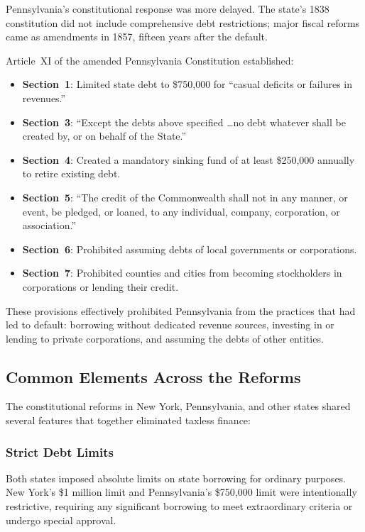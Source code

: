 \documentclass[11pt]{article}
\begin{document}
Pennsylvania's constitutional response was more delayed.  The state's 1838
constitution did not include comprehensive debt restrictions; major fiscal
reforms came as amendments in 1857, fifteen years after the default.

Article~XI of the amended Pennsylvania Constitution established:

\begin{itemize}
  \item \textbf{Section~1}: Limited state debt to \$750,000 for ``casual
    deficits or failures in revenues.''
  \item \textbf{Section~3}: ``Except the debts above specified \ldots no debt
    whatever shall be created by, or on behalf of the State.''
  \item \textbf{Section~4}: Created a mandatory sinking fund of at least
    \$250,000 annually to retire existing debt.
  \item \textbf{Section~5}: ``The credit of the Commonwealth shall not in any
    manner, or event, be pledged, or loaned, to any individual, company,
    corporation, or association.''
  \item \textbf{Section~6}: Prohibited assuming debts of local governments or
    corporations.
  \item \textbf{Section~7}: Prohibited counties and cities from becoming
    stockholders in corporations or lending their credit.
\end{itemize}

These provisions effectively prohibited Pennsylvania from the practices that
had led to default: borrowing without dedicated revenue sources, investing in
or lending to private corporations, and assuming the debts of other entities.

\subsection{Common Elements Across the Reforms}

The constitutional reforms in New York, Pennsylvania, and other states shared
several features that together eliminated taxless finance:

\subsubsection*{Strict Debt Limits}
Both states imposed absolute limits on state borrowing for ordinary purposes.
New York's \$1 million limit and Pennsylvania's \$750,000 limit were
intentionally restrictive, requiring any significant borrowing to meet
extraordinary criteria or undergo special approval.
\end{document}
